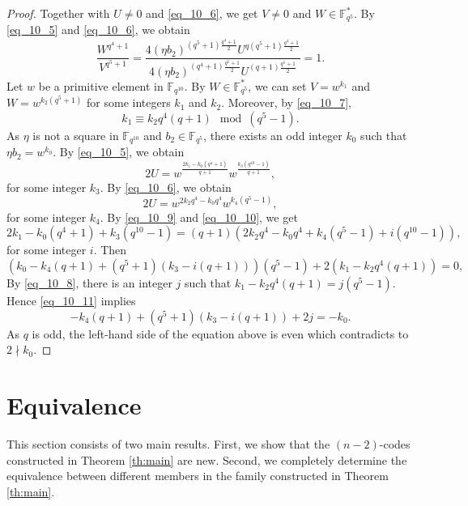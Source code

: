 \documentclass{amsart}
\theoremstyle{plain}
\theoremstyle{definition}
\newcommand{\F}{\mathbb F}
\begin{document}
\begin{proof}
		Together with $U\neq 0$ and \eqref{eq_10_6}, we get $V\neq 0$ and $W\in\mathbb{F}_{q^5}^*$.
		By \eqref{eq_10_5} and \eqref{eq_10_6}, we obtain
		\begin{equation}\label{eq_10_7}
			\frac{W^{q^4+1}}{V^{q^5+1}}=\frac{4(\eta b_2)^{(q^5+1)\frac{q^4+1}{2}}U^{q(q^5+1)\frac{q^4+1}{2}}}{4(\eta b_2)^{(q^4+1)\frac{q^5+1}{2}}U^{(q+1)\frac{q^5+1}{2}}}=1.
		\end{equation} 
		Let $w$ be a primitive element in $\F_{q^{10}}$. By $W\in\F_{q^5}^*$, we can set \(V=w^{k_1}\) and \(W=w^{k_2(q^5+1)}\) for some integers $k_1$ and $k_2$. Moreover, by \eqref{eq_10_7},
		\begin{equation}\label{eq_10_8}
			k_1 \equiv k_2q^4(q+1)\mod(q^5-1).
		\end{equation}
		As $\eta$ is not a square in $\F_{q^{10}}$ and $b_2\in\F_{q^5}$, there exists an odd integer $k_0$ such that $\eta b_2=w^{k_0}$. By \eqref{eq_10_5}, we obtain 
		\begin{equation}\label{eq_10_9}
			2U=w^{\frac{2k_1-k_0(q^4+1)}{q+1}}w^{\frac{k_3(q^{10}-1)}{q+1}},
		\end{equation}
		for some integer $k_3$.
		By \eqref{eq_10_6}, we obtain 
		\begin{equation}\label{eq_10_10}
			2U=w^{2k_2q^4-k_0q^4}w^{k_4(q^5-1)},
		\end{equation}
		for some integer $k_4$.
		By \eqref{eq_10_9} and \eqref{eq_10_10}, we get 
		$$2k_1-k_0(q^4+1)+k_3(q^{10}-1)=(q+1)\left(2k_2q^4-k_0q^4+k_4(q^5-1)+i(q^{10}-1)\right),$$
		for some integer $i$. Then  
		\begin{equation}\label{eq_10_11}
			\left(k_0-k_4(q+1)+(q^5+1)(k_3-i(q+1))\right)(q^5-1)+2(k_1-k_2q^4(q+1))=0,
		\end{equation}
		By \eqref{eq_10_8}, there is an integer $j$ such that $k_1-k_2q^4(q+1)=j(q^5-1)$.
		Hence \eqref{eq_10_11} implies 
		\[-k_4(q+1)+(q^5+1)(k_3-i(q+1))+2j=-k_0.\]
		As $q$ is odd,  the left-hand side of the equation above is even which contradicts to $2\nmid k_0$.
	\end{proof}
	
	\section{Equivalence}\label{sec:equi}
	This section consists of two main results. First, we show that the $(n-2)$-codes constructed in Theorem \ref{th:main} are new. Second, we completely determine the equivalence between different members in the family constructed in  Theorem \ref{th:main}.
	
\end{document}
